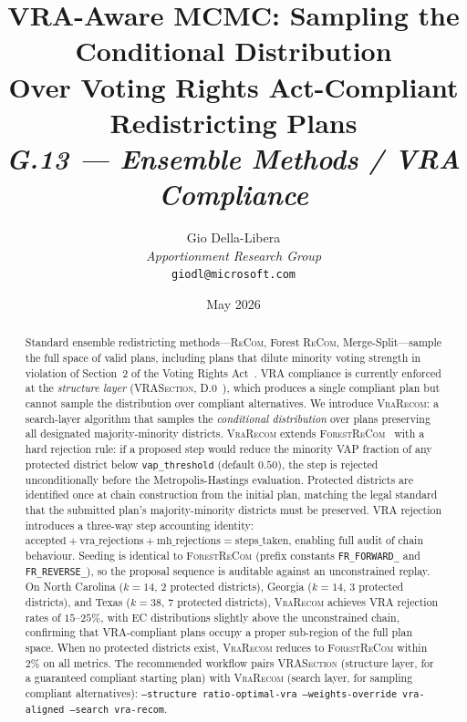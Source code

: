\documentclass[12pt]{article}
\title{%
  \textbf{VRA-Aware MCMC: Sampling the Conditional Distribution\\
          Over Voting Rights Act-Compliant Redistricting Plans}\\[0.8em]
  \normalsize\textit{G.13 --- Ensemble Methods / VRA Compliance}%
}
\author{%
  Gio Della-Libera\\
  \textit{Apportionment Research Group}\\
  \small\texttt{giodl@microsoft.com}
}
\date{May 2026}
\newcommand{\vr}{\textsc{VraRecom}}
\newcommand{\fr}{\textsc{ForestReCom}}
\newcommand{\recom}{\textsc{ReCom}}
\newcommand{\vraSection}{\textsc{VRASection}}
\begin{document}
\maketitle

\begin{abstract}
\noindent
Standard ensemble redistricting methods---\recom{}, Forest \recom{},
Merge-Split---sample the full space of valid plans, including plans that
dilute minority voting strength in violation of Section~2 of the Voting
Rights Act~\citep{gingles1986}.
VRA compliance is currently enforced at the \emph{structure layer}
(\vraSection{}, D.0~\citep{dellaLibera2026vraSection}), which produces a single
compliant plan but cannot sample the distribution over compliant alternatives.
We introduce \vr{}: a search-layer algorithm that samples the \emph{conditional
distribution} over plans preserving all designated majority-minority districts.
\vr{} extends \fr{}~\citep{dellaLibera2026forestRecom} with a hard rejection
rule: if a proposed step would reduce the minority VAP fraction of any
protected district below \texttt{vap\_threshold} (default $0.50$), the step
is rejected unconditionally before the Metropolis-Hastings evaluation.
Protected districts are identified once at chain construction from the initial
plan, matching the legal standard that the submitted plan's majority-minority
districts must be preserved.
VRA rejection introduces a three-way step accounting identity:
$\text{accepted} + \text{vra\_rejections} + \text{mh\_rejections} = \text{steps\_taken}$,
enabling full audit of chain behaviour.
Seeding is identical to \fr{} (prefix constants \texttt{FR\_FORWARD\_} and
\texttt{FR\_REVERSE\_}), so the proposal sequence is auditable against an
unconstrained replay.
On North Carolina ($k = 14$, 2 protected districts), Georgia ($k = 14$,
3 protected districts), and Texas ($k = 38$, 7 protected districts),
\vr{} achieves VRA rejection rates of $15$--$25\%$, with EC distributions
slightly above the unconstrained chain, confirming that VRA-compliant plans
occupy a proper sub-region of the full plan space.
When no protected districts exist, \vr{} reduces to \fr{} within $2\%$
on all metrics.
The recommended workflow pairs \vraSection{} (structure layer, for a
guaranteed compliant starting plan) with \vr{} (search layer, for sampling
compliant alternatives): \texttt{--structure ratio-optimal-vra --weights-override
vra-aligned --search vra-recom}.
\end{abstract}

\tableofcontents
\newpage










\end{document}
